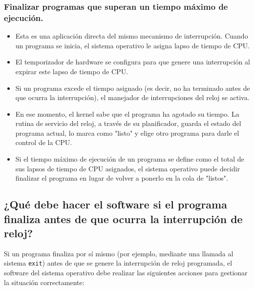 \documentclass{article}
\begin{document}
{{\subsubsection*{Finalizar programas que superan un tiempo máximo de ejecución.}
\begin{itemize}
    \item Esta es una aplicación directa del mismo mecanismo de interrupción. Cuando un programa se inicia, el sistema operativo le asigna lapso de tiempo de CPU.
    \item El temporizador de hardware se configura para que genere una interrupción al expirar este lapso de tiempo de CPU.
    \item Si un programa excede el tiempo asignado (es decir, no ha terminado antes de que ocurra la interrupción), el manejador de interrupciones del reloj se activa.
    \item En ese momento, el kernel sabe que el programa ha agotado su tiempo. La rutina de servicio del reloj, a través de su planificador, guarda el estado del programa actual, lo marca como "listo" y elige otro programa para darle el control de la CPU.
    \item Si el tiempo máximo de ejecución de un programa se define como el total de sus lapsos de tiempo de CPU  asignados, el sistema operativo puede decidir finalizar el programa en lugar de volver a ponerlo en la cola de "listos".
\end{itemize}

\subsection{¿Qué debe hacer el software si el programa finaliza antes de que ocurra la interrupción de reloj?}

Si un programa finaliza por sí mismo (por ejemplo, mediante una llamada al sistema \texttt{exit}) antes de que se genere la interrupción de reloj programada, el software del sistema operativo debe realizar las siguientes acciones para gestionar la situación correctamente:

}}
\end{document}
